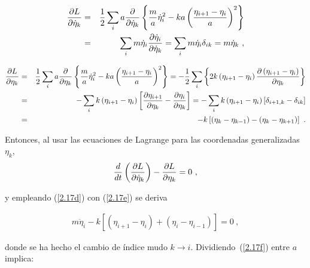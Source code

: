 \begin{eqnarray}
\frac{\partial L}{\partial \dot{\eta}_{k}} &=&\frac{1}{2}\sum\limits_{i}a%
\frac{\partial }{\partial \dot{\eta}_{k}}\left\{ \frac{m}{a}\dot{\eta}%
_{i}^{2}-ka\left( \frac{\eta _{i+1}-\eta _{i}}{a}\right) ^{2}\right\}  \notag
\\
&=&\sum\limits_{i}m\dot{\eta}_{i}\frac{\partial \dot{\eta}_{i}}{\partial 
\dot{\eta}_{k}}=\sum\limits_{i}m\dot{\eta}_{i}\delta _{ik}=m\dot{\eta}_{k}~,
\label{2.17d}
\end{eqnarray}

\begin{eqnarray}
\frac{\partial L}{\partial \eta _{k}} &=&\frac{1}{2}\sum\limits_{i}a\frac{%
\partial }{\partial \eta _{k}}\left\{ \frac{m}{a}\dot{\eta}_{i}^{2}-ka\left( 
\frac{\eta _{i+1}-\eta _{i}}{a}\right) ^{2}\right\} =-\frac{1}{2}%
\sum\limits_{i}\left\{ 2k\left( \eta _{i+1}-\eta _{i}\right) \frac{\partial
\left( \eta _{i+1}-\eta _{i}\right) }{\partial \eta _{k}}\right\}  \notag \\
&=&-\sum\limits_{i}k\left( \eta _{i+1}-\eta _{i}\right) \left[ \frac{%
\partial \eta _{i+1}}{\partial \eta _{k}}-\frac{\partial \eta _{i}}{\partial
\eta _{k}}\right] =-\sum\limits_{i}k\left( \eta _{i+1}-\eta _{i}\right) %
\left[ \delta _{i+1,k}-\delta _{ik}\right]  \notag \\
&=&-k\left[ \left( \eta _{k}-\eta _{k-1}\right) -\left( \eta _{k}-\eta
_{k+1}\right) \right] ~.  \label{2.17e}
\end{eqnarray}

\noindent
Entonces, al usar las ecuaciones de Lagrange para las coordenadas generalizadas $\eta _{k}$,
\begin{equation}
\frac{d}{dt}\left( \frac{\partial L}{\partial \dot{\eta}_{k}}\right) -\frac{%
\partial L}{\partial \eta _{k}}=0~,  \label{2.17c}
\end{equation}

\noindent
y empleando (\ref{2.17d}) con (\ref{2.17e}) se deriva

\begin{eqnarray}
m\ddot{\eta}_{i}-k\left[ \left( \eta _{i+1}-\eta _{i}\right) +\left(\eta_{i}-\eta _{i-1}\right) \right]=0~,  \label{2.17f}
\end{eqnarray}

\noindent 
donde se ha hecho el cambio de índice mudo $k \rightarrow i$. Dividiendo\ (\ref{2.17f}) entre $a$ implica:

